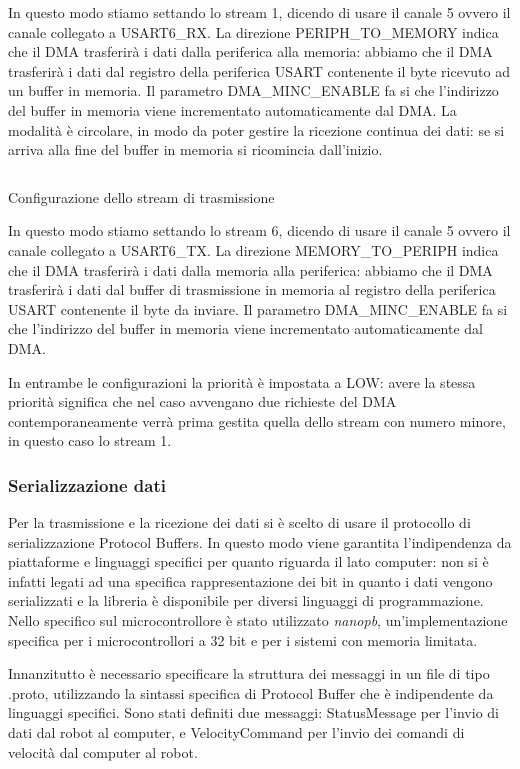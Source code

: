 In questo modo stiamo settando lo stream 1, dicendo di usare il canale 5 ovvero il canale collegato a USART6\_RX. La direzione PERIPH\_TO\_MEMORY indica che il DMA trasferirà i dati dalla periferica alla memoria: abbiamo che il DMA trasferirà i dati dal registro della periferica USART contenente il byte ricevuto ad un buffer in memoria. Il parametro DMA\_MINC\_ENABLE fa si che l'indirizzo del buffer in memoria viene incrementato automaticamente dal DMA. 
La modalità è circolare, in modo da poter gestire la ricezione continua dei dati: se si arriva alla fine del buffer in memoria si ricomincia dall'inizio.

\begin{listing}[ht]
\inputminted[frame=single,framesep=10pt]{c}{codice/dma2_tx_config.c}
\caption{Configurazione dello stream di trasmissione}
\label{listing:DMA_tx_config}
\end{listing}

In questo modo stiamo settando lo stream 6, dicendo di usare il canale 5 ovvero il canale collegato a USART6\_TX. La direzione MEMORY\_TO\_PERIPH indica che il DMA trasferirà i dati dalla memoria alla periferica: abbiamo che il DMA trasferirà i dati dal buffer di trasmissione in memoria al registro della periferica USART contenente il byte da inviare. Il parametro DMA\_MINC\_ENABLE fa si che l'indirizzo del buffer in memoria viene incrementato automaticamente dal DMA. 

In entrambe le configurazioni la priorità è impostata a LOW: avere la stessa priorità significa che nel caso avvengano due richieste del DMA contemporaneamente verrà prima gestita quella dello stream con numero minore, in questo caso lo stream 1.

\subsubsection{Serializzazione dati}
Per la trasmissione e la ricezione dei dati si è scelto di usare il protocollo di serializzazione Protocol Buffers. In questo modo viene garantita l'indipendenza da piattaforme e linguaggi specifici per quanto riguarda il lato computer: non si è infatti legati ad una specifica rappresentazione dei bit 
in quanto i dati vengono serializzati e la libreria è disponibile per diversi linguaggi di programmazione. Nello specifico sul microcontrollore è stato utilizzato \textit{nanopb}, un'implementazione specifica per i microcontrollori a 32 bit e per i sistemi con memoria limitata.

Innanzitutto è necessario specificare la struttura dei messaggi in un file di tipo .proto, utilizzando la sintassi specifica di Protocol Buffer che è indipendente da linguaggi specifici. Sono stati definiti due messaggi: StatusMessage per l'invio di dati dal robot al computer, e VelocityCommand per l'invio dei comandi di velocità dal computer al robot.

